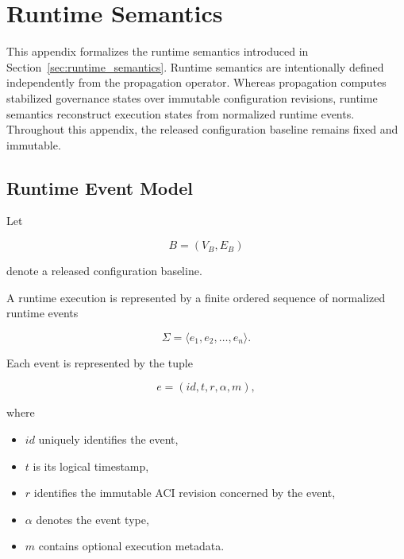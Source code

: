 \documentclass[10pt]{article}
\begin{document}
\section{Runtime Semantics}
\label{appendix:runtime_semantics}

This appendix formalizes the runtime semantics introduced in
Section~\ref{sec:runtime_semantics}. Runtime semantics are intentionally
defined independently from the propagation operator. Whereas propagation
computes stabilized governance states over immutable configuration revisions,
runtime semantics reconstruct execution states from normalized runtime events.
Throughout this appendix, the released configuration baseline remains fixed and
immutable.

\subsection{Runtime Event Model}
\label{appendix:runtime_event_model}

Let

\[
B=(V_B,E_B)
\]

denote a released configuration baseline.

A runtime execution is represented by a finite ordered sequence of normalized
runtime events

\begin{equation}
\Sigma
=
\langle
e_1,e_2,\ldots,e_n
\rangle.
\end{equation}

Each event is represented by the tuple

\begin{equation}
e
=
(
id,
t,
r,
\alpha,
m
),
\end{equation}

where

\begin{itemize}
	\item $id$ uniquely identifies the event,
	\item $t$ is its logical timestamp,
	\item $r$ identifies the immutable ACI revision concerned by the event,
	\item $\alpha$ denotes the event type,
	\item $m$ contains optional execution metadata.
\end{itemize}
\end{document}
